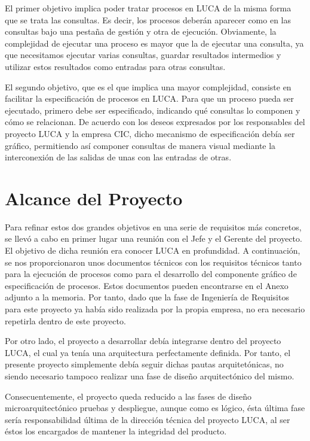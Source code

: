 El primer objetivo implica poder tratar procesos en LUCA de la misma forma que se trata las consultas. Es decir, los procesos deberán aparecer como en las consultas bajo una pestaña de gestión y otra de ejecución. Obviamente, la complejidad de ejecutar una proceso es mayor que la de ejecutar una consulta, ya que necesitamos ejecutar varias consultas, guardar resultados intermedios y utilizar estos resultados como entradas para otras consultas.

El segundo objetivo, que es el que implica una mayor complejidad, consiste en facilitar la especificación de procesos en LUCA. Para que un proceso pueda ser ejecutado, primero debe ser especificado, indicando qué consultas lo componen y cómo se relacionan. De acuerdo con los deseos expresados por los responsables del proyecto LUCA y la empresa CIC, dicho mecanismo de especificación debía ser gráfico, permitiendo así componer consultas de manera visual mediante la interconexión de las salidas de unas con las entradas de otras.

\section{Alcance del Proyecto}

Para refinar estos dos grandes objetivos en una serie de requisitos más concretos, se llevó a cabo en primer lugar una reunión con el Jefe y el Gerente del proyecto. El objetivo de dicha reunión era conocer LUCA en profundidad. A continuación, se nos proporcionaron unos documentos técnicos con los requisitos técnicos tanto para la ejecución de procesos como para el desarrollo del componente gráfico de especificación de procesos. Estos documentos pueden encontrarse en el Anexo adjunto a la memoria. Por tanto, dado que la fase de Ingeniería de Requisitos para este proyecto ya había sido realizada por la propia empresa, no era necesario repetirla dentro de este proyecto. 

Por otro lado, el proyecto a desarrollar debía integrarse dentro del proyecto LUCA, el cual ya tenía una arquitectura perfectamente definida. Por tanto, el presente proyecto simplemente debía seguir dichas pautas arquitetónicas, no siendo necesario tampoco realizar una fase de diseño arquitectónico del mismo. 

Consecuentemente, el proyecto queda reducido a las fases de diseño microarquitectónico pruebas y despliegue, aunque como es lógico, ésta última fase sería responsabilidad última de la dirección técnica del proyecto LUCA, al ser éstos los encargados de mantener la integridad del producto.

